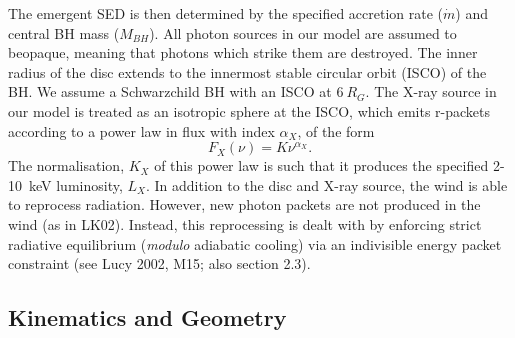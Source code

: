 \documentclass[preprint, a4paper, 11pt]{aastex}
\begin{document}
The emergent SED is then determined by the specified accretion rate ($\dot{m}$)
and central BH mass ($M_{BH}$).
All photon sources in our model are assumed to beopaque, meaning
that photons which strike them are destroyed.
The inner radius of the disc extends to the innermost 
stable circular orbit (ISCO) of the BH. 
We assume a Schwarzchild BH with an ISCO at $6~R_G$.
The X-ray source in our model is treated as an isotropic sphere at the ISCO,
which emits r-packets according to a power law in flux with index $\alpha_X$, of the form
\begin{equation}
F_X (\nu) = K \nu^{\alpha_X}.
\end{equation}
The normalisation, $K_X$ of this power law is such that it 
produces the specified 2-10~keV luminosity, $L_X$.
In addition to the disc and X-ray source, 
the wind is able to reprocess radiation. However, new 
photon packets are not produced in the wind (as in LK02). 
Instead, this reprocessing is dealt with by enforcing strict
radiative equilibrium ({\em modulo} adiabatic cooling)
via an indivisible energy packet
constraint (see Lucy 2002, M15; also section 2.3).









\subsection{Kinematics and Geometry}
\end{document}
